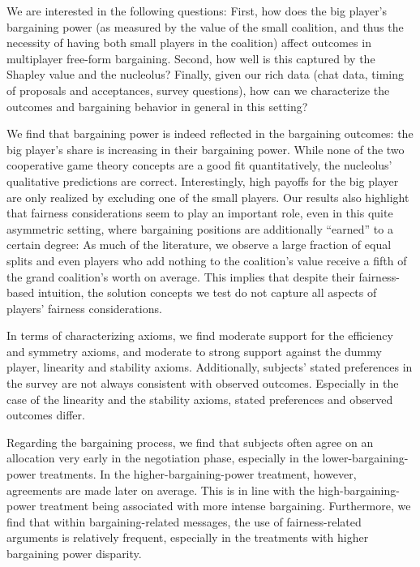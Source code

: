 \documentclass[12pt]{article}
\begin{document}
We are interested in the following questions: First, how does the big player's bargaining power (as measured by the value of the small coalition, and thus the necessity of having both small players in the coalition) affect outcomes in multiplayer free-form bargaining. Second, how well is this captured by the Shapley value and the nucleolus? Finally, given our rich data (chat data, timing of proposals and acceptances, survey questions), how can we characterize the outcomes and bargaining behavior in general in this setting?





We find that bargaining power is indeed reflected in the bargaining outcomes: the big player's share is increasing in their bargaining power. While none of the two cooperative game theory concepts are a good fit quantitatively, the nucleolus' qualitative predictions are correct. Interestingly, high payoffs for the big player are only realized by excluding one of the small players. Our results also highlight that fairness considerations seem to play an important role, even in this quite asymmetric setting, where bargaining positions are additionally ``earned'' to a certain degree: As much of the literature, we observe a large fraction of equal splits and even players who add nothing to the coalition's value receive a fifth of the grand coalition's worth on average. This implies that despite their fairness-based intuition, the solution concepts we test do not capture all aspects of players' fairness considerations.

In terms of characterizing axioms, we find moderate support for the efficiency and symmetry axioms, and moderate to strong support against the dummy player, linearity and stability axioms. Additionally, subjects' stated preferences in the survey are not always consistent with observed outcomes. Especially in the case of the linearity and the stability axioms, stated preferences and observed outcomes differ.


Regarding the bargaining process, we find that subjects often agree on an allocation very early in the negotiation phase, especially in the lower-bargaining-power treatments. In the higher-bargaining-power treatment, however, agreements are made later on average. This is in line with the high-bargaining-power treatment being associated with more intense bargaining. Furthermore, we find that within bargaining-related messages, the use of fairness-related arguments is relatively frequent, especially in the treatments with higher bargaining power disparity. 
\end{document}
